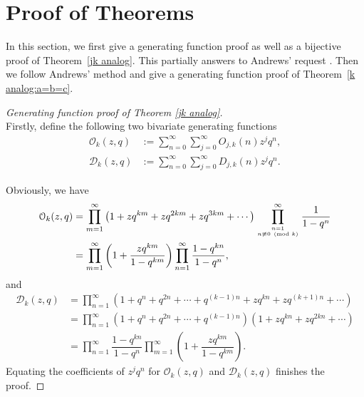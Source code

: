\documentclass[12pt]{amsart}
\numberwithin{equation}{section}
\theoremstyle{plain}
\theoremstyle{definition}
\begin{document}
\section{Proof of Theorems}

In this section, we first give a generating function proof as well as a bijective proof of Theorem~\ref{jk analog}. This partially answers to Andrews' request \cite{Andr2}. Then we follow Andrews' method and give a generating function proof of Theorem~\ref{k analog:a=b=c}.

\begin{proof}[Generating function proof of Theorem \ref{jk analog}]\ \\
Firstly, define the following two bivariate generating functions
\begin{align*}
\mathcal{O}_{k}(z,q) &:=\sum_{n=0}^{\infty}\sum_{j=0}^{\infty}O_{j,k}(n)z^{j}q^{n},\\
\mathcal{D}_{k}(z,q) &:=\sum_{n=0}^{\infty}\sum_{j=0}^{\infty}D_{j,k}(n)z^{j}q^{n}.
\end{align*}

Obviously, we have
\begin{align}
\mathcal{O}_{k}(z,q) &=\prod_{m=1}^{\infty}\left(1+zq^{km}+zq^{2km}+zq^{3km}+\cdots\right)\prod_{n=1\atop n\not\equiv0\pmod{k}}^{\infty}\dfrac{1}{1-q^{n}}\label{gene fun1}\\
 &=\prod_{m=1}^{\infty}\left(1+\dfrac{zq^{km}}{1-q^{km}}\right)\prod_{n=1}^{\infty}\dfrac{1-q^{kn}}{1-q^{n}},\nonumber
\end{align}
and
\begin{align}
\mathcal{D}_{k}(z,q) &=\prod_{n=1}^{\infty}\left(1+q^{n}+q^{2n}+\cdots+q^{(k-1)n}+zq^{kn}+zq^{(k+1)n}+\cdots\right)\label{gene fun2}\\
 &=\prod_{n=1}^{\infty}\left(1+q^{n}+q^{2n}+\cdots+q^{(k-1)n}\right)\left(1+zq^{kn}+zq^{2kn}+\cdots\right)\nonumber\\
 &=\prod_{n=1}^{\infty}\dfrac{1-q^{kn}}{1-q^{n}}\prod_{m=1}^{\infty}\left(1+\dfrac{zq^{km}}{1-q^{km}}\right).\nonumber
\end{align}
Equating the coefficients of $z^{j}q^{n}$ for $\mathcal{O}_{k}(z,q)$ and $\mathcal{D}_{k}(z,q)$ finishes the proof.
\end{proof}
\end{document}
